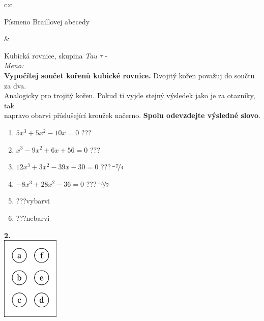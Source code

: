 \documentclass[10pt]{report}
\begin{document}
\begin{tabular}{c:c}
\begin{minipage}[c][99mm][t]{0.49\linewidth}
\begin{center}
\begin{minipage}{0.20\linewidth}
\begin{center}
{\small Písmeno Braillovej abecedy}
\end{center}
\end{minipage}
\end{center}
\end{minipage}
&
\begin{minipage}[c][99mm][t]{0.49\linewidth}
\begin{center}
\vspace{7mm}
{\huge Kubická rovnice, skupina \textit{Tau $\tau$} -}\\[4.5mm]
\textit{Meno:}\phantom{xxxxxxxxxxxxxxxxxxxxxxxxxxxxxxxxxxxxxxxxxxxxxxxxxxxxxxxxxxxxxxxxx}\\[3.5mm]
\textbf{Vypočítej součet kořenů kubické rovnice.} Dvojitý kořen považuj do součtu za dva.\\Analogicky pro trojitý kořen. Pokud ti vyjde stejný výsledek jako je za otazníky, tak\\napravo obarvi příslušející kroužek načerno. \textbf{Spolu odevzdejte výsledné slovo}.\\[3mm]
\begin{minipage}{0.77\linewidth}
\begin{center}
\begin{varwidth}{\textwidth}
\begin{enumerate}
\large
\item $5x^3+5x^2-10x=0$\quad \dotfill\; ???\;\dotfill {}
\item $x^3-9x^2+6x+56=0$\quad \dotfill\; ???\;\dotfill {}
\item $12x^3+3x^2-39x-30=0$\quad \dotfill\; ???\;\dotfill \quad $\nicefrac{-7}{4}$
\item $-8x^3+28x^2-36=0$\quad \dotfill\; ???\;\dotfill \quad $\nicefrac{-5}{2}$
\item \quad \dotfill\; ???\;\dotfill \quad vybarvi
\item \quad \dotfill\; ???\;\dotfill \quad nebarvi
\end{enumerate}
\end{varwidth}
\end{center}
\end{minipage}
\begin{minipage}{0.20\linewidth}
\begin{center}
{\Huge\bfseries 2.} \\[2mm]
\includegraphics[height=40mm]{../images/braille.png}

\end{center}
\end{minipage}
\end{center}
\end{minipage}
\end{tabular}
\end{document}
